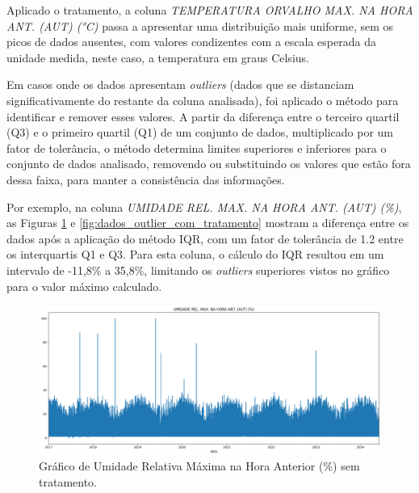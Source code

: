 Aplicado o tratamento, a coluna \textit{TEMPERATURA ORVALHO MAX. NA HORA ANT. (AUT) (°C)} passa a apresentar uma distribuição mais uniforme, sem os picos de dados ausentes, com valores condizentes com a escala esperada da unidade medida, neste caso, a temperatura em graus Celsius.

Em casos onde os dados apresentam \textit{outliers} (dados que se distanciam significativamente do restante da coluna analisada), foi aplicado o método  para identificar e remover esses valores. A partir da diferença entre o terceiro quartil (Q3) e o primeiro quartil (Q1) de um conjunto de dados, multiplicado por um fator de tolerância, o método determina limites superiores e inferiores para o conjunto de dados analisado, removendo ou substituindo os valores que estão fora dessa faixa, para manter a consistência das informações.

Por exemplo, na coluna \textit{UMIDADE REL. MAX. NA HORA ANT. (AUT) (\%)}, as Figuras \ref{fig:dados_outlier_sem_tratamento} e \ref{fig:dados_outlier_com_tratamento} mostram a diferença entre os dados após a aplicação do método \gls{IQR}, com um fator de tolerância de 1.2 entre os interquartis Q1 e Q3. Para esta coluna, o cálculo do IQR resultou em um intervalo de -11,8\% a 35,8\%, limitando os \textit{outliers} superiores vistos no gráfico para o valor máximo calculado. 

\begin{figure}[H]
	\caption{\label{fig:dados_outlier_sem_tratamento}Gráfico de Umidade Relativa Máxima  na Hora Anterior (\%) sem tratamento.}
	\begin{center}
		\includegraphics[scale=0.35]{figuras/UMIDADE REL. MAX. NA HORA ANT. (AUT) SEM TRATAMENTO.png}
	\end{center}
\end{figure}

